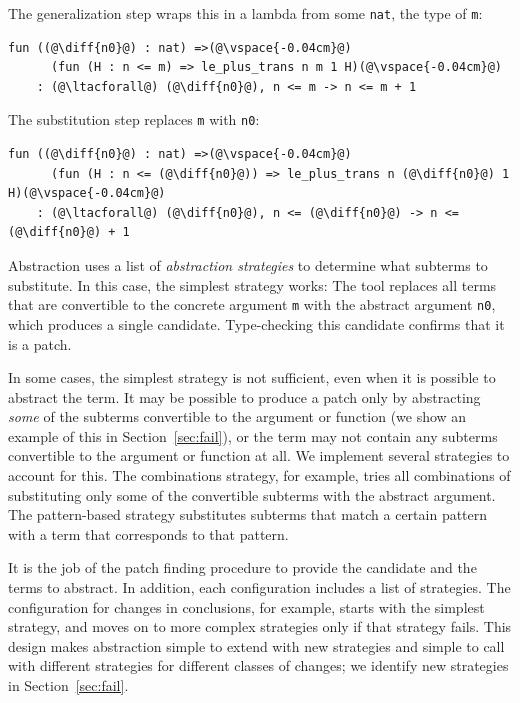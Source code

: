 The generalization step wraps this in a lambda from some \lstinline{nat}, the type of \lstinline{m}:

\begin{lstlisting}[language=coq]
    fun ((@\diff{n0}@) : nat) =>(@\vspace{-0.04cm}@)
      (fun (H : n <= m) => le_plus_trans n m 1 H)(@\vspace{-0.04cm}@)
    : (@\ltacforall@) (@\diff{n0}@), n <= m -> n <= m + 1
\end{lstlisting}

The substitution step replaces \lstinline{m} with \lstinline{n0}:

\begin{lstlisting}[language=coq]
    fun ((@\diff{n0}@) : nat) =>(@\vspace{-0.04cm}@)
      (fun (H : n <= (@\diff{n0}@)) => le_plus_trans n (@\diff{n0}@) 1 H)(@\vspace{-0.04cm}@)
    : (@\ltacforall@) (@\diff{n0}@), n <= (@\diff{n0}@) -> n <= (@\diff{n0}@) + 1
\end{lstlisting}

Abstraction uses a list of \textit{abstraction strategies} to determine what subterms
to substitute. In this case, the simplest strategy works: The tool
replaces all terms that are convertible to the concrete argument \lstinline{m} with the abstract argument
\lstinline{n0}, which produces a single candidate. Type-checking this candidate confirms that it is a patch.

In some cases, the simplest strategy is not sufficient, even when it is possible to abstract the term.
It may be possible to produce a patch only by abstracting \emph{some} of the subterms
convertible to the argument or function (we show an example of this in Section~\ref{sec:fail}),
or the term may not contain any subterms convertible to the argument or function at all.
We implement several strategies to account for this. The combinations strategy, for example,
tries all combinations of substituting only some of the convertible subterms with the abstract argument. 
The pattern-based strategy substitutes subterms that match a certain pattern
with a term that corresponds to that pattern.

It is the job of the patch finding procedure to provide the candidate and the terms to abstract.
In addition, each configuration includes a list of strategies.
The configuration for changes in conclusions, for example, starts with the simplest strategy,
and moves on to more complex strategies only if that strategy fails.
This design makes abstraction simple to extend with new strategies and simple to call with different strategies
for different classes of changes; we identify new strategies in Section~\ref{sec:fail}.

